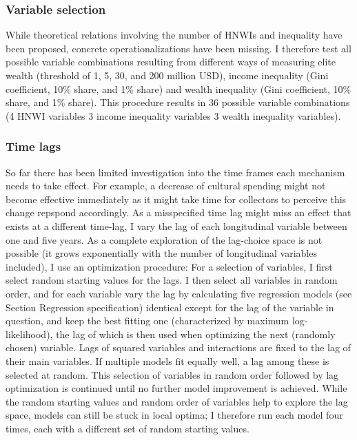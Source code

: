 \documentclass[11pt, authoryear]{elsarticle}
\begin{document}
\subsubsection*{Variable selection}
\label{vrbl_slctn}
While theoretical relations involving the number of HNWIs and inequality have been proposed, concrete operationalizations have been missing.
I therefore test all possible variable combinations resulting from different ways of measuring elite wealth (threshold of 1, 5, 30, and 200 million USD), income inequality (Gini coefficient, 10\% share, and 1\% share) and wealth inequality (Gini coefficient, 10\% share, and 1\% share).
This procedure results in 36 possible variable combinations (4 HNWI variables \texttimes{} 3 income inequality variables \texttimes{} 3 wealth inequality variables). 


\subsubsection*{Time lags}

So far there has been limited investigation into the time frames each mechanism needs to take effect.
For example, a decrease of cultural spending might not become effective immediately as it might take time for collectors to perceive this change repspond accordingly.
As a misspecified time lag might miss an effect that exists at a different time-lag, I vary the lag of each longitudinal variable between one and five years.
As a complete exploration of the lag-choice space is not possible (it grows exponentially with the number of longitudinal variables included), I use an optimization procedure:
For a selection of variables, I first select random starting values for the lags.
I then select all variables in random order, and for each variable vary the lag by calculating five regression models (see Section Regression specification) identical except for the lag of the variable in question, and keep the best fitting one (characterized by maximum log-likelihood), the lag of which is then used when optimizing the next (randomly chosen) variable.
Lags of squared variables and interactions are fixed to the lag of their main variables.
If multiple models fit equally well, a lag among these is selected at random.
This selection of variables in random order followed by lag optimization is continued until no further model improvement is achieved.
While the random starting values and random order of variables help to explore the lag space, models can still be stuck in local optima; I therefore run each model four times, each with a different set of random starting values. 
\end{document}
